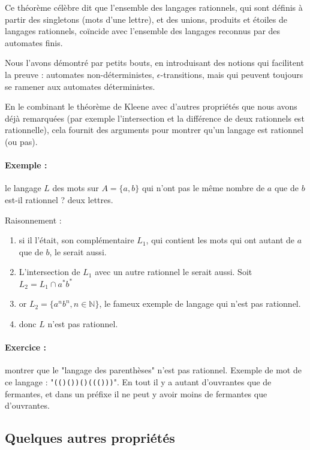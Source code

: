 \documentclass[10pt,twoside]{article}
\begin{document}
Ce théorème célèbre dit que l'ensemble des 
langages rationnels, qui sont définis à
 partir des singletons (mots d'une lettre), et des unions, 
 produits et
 étoiles de langages rationnels, coïncide avec
 l'ensemble des langages reconnus par
 des automates finis. 
 
 Nous l'avons démontré par petits bouts, en introduisant
 des notions qui facilitent la preuve : automates 
 non-déterministes, $\epsilon$-transitions, mais qui peuvent
 toujours se ramener
 aux automates déterministes.
 
 En le combinant le théorème de Kleene avec 
 d'autres propriétés que nous avons
 déjà remarquées (par exemple 
 l'intersection et la différence de deux
 rationnels est rationnelle), cela fournit des arguments
 pour montrer qu'un langage est rationnel (ou pas).

\paragraph{Exemple :} le langage $L$ des mots sur $A = \{a, b \}$ qui
n'ont pas le même nombre de $a$ que de $b$ est-il rationnel ?
deux lettres.

Raisonnement :
\begin{enumerate}
\item si il l'était, son complémentaire $L_1$, 
qui contient les mots qui ont autant
de $a$ que de $b$, le serait aussi. 
\item L'intersection de $L_1$ avec un autre rationnel le serait aussi.
Soit $L_2 = L_1 \cap a^* b^*$
\item or $L_2 = \{ a^n b^n, n \in \mathbb{N}\}$, le fameux exemple
 de langage  qui n'est pas rationnel.
 \item donc $L$ n'est pas rationnel.
\end{enumerate}

\paragraph{Exercice : } montrer que le "langage des parenthèses" 
n'est pas rationnel.  Exemple de mot de ce langage : 
"\texttt{(()())()((()))}". En tout il y a autant d'ouvrantes 
que de fermantes,
et dans un préfixe il ne peut y avoir moins de fermantes 
que d'ouvrantes.

 \subsection{Quelques autres propriétés}
 
\end{document}
